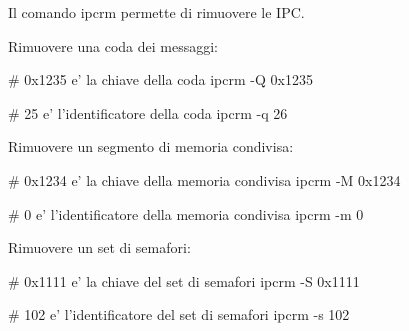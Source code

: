 Il comando {\ttfamily ipcrm} permette di rimuovere le I\+PC.

Rimuovere una coda dei messaggi\+: 
\begin{DoxyCode}
# 0x1235 e' la chiave della coda
ipcrm -Q 0x1235

# 25 e' l'identificatore della coda
ipcrm -q 26
\end{DoxyCode}


Rimuovere un segmento di memoria condivisa\+: 
\begin{DoxyCode}
# 0x1234 e' la chiave della memoria condivisa
ipcrm -M 0x1234

# 0 e' l'identificatore della memoria condivisa
ipcrm -m 0
\end{DoxyCode}


Rimuovere un set di semafori\+: 
\begin{DoxyCode}
# 0x1111 e' la chiave del set di semafori
ipcrm -S 0x1111

# 102 e' l'identificatore del set di semafori
ipcrm -s 102
\end{DoxyCode}
 
